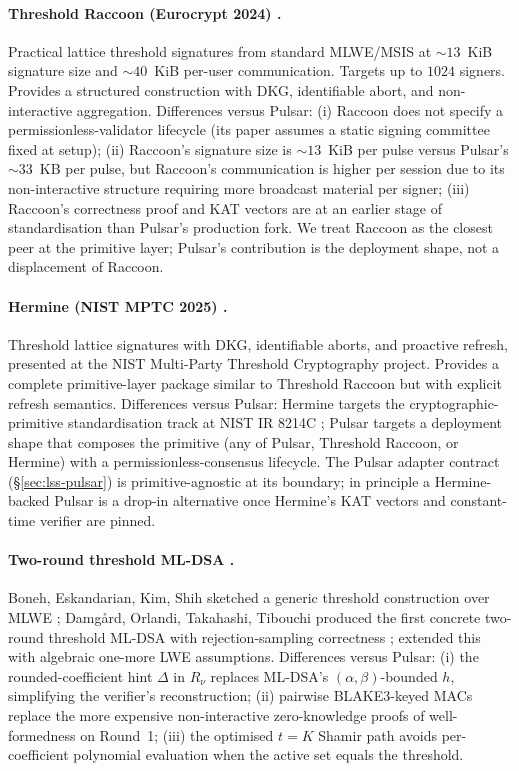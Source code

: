 \paragraph{Threshold Raccoon (Eurocrypt 2024) \cite{thresholdraccoon}.}
Practical lattice threshold signatures from standard MLWE/MSIS at
$\sim 13$~KiB signature size and $\sim 40$~KiB per-user communication.
Targets up to $1024$ signers. Provides a structured construction with
DKG, identifiable abort, and non-interactive aggregation. Differences
versus Pulsar: (i) Raccoon does not specify a permissionless-validator
lifecycle (its paper assumes a static signing committee fixed at
setup); (ii) Raccoon's signature size is $\sim 13$~KiB per pulse versus
Pulsar's $\sim 33$~KB per pulse, but Raccoon's communication is higher
per session due to its non-interactive structure requiring more
broadcast material per signer; (iii) Raccoon's correctness proof and
KAT vectors are at an earlier stage of standardisation than Pulsar's
production fork. We treat Raccoon as the closest peer at the
primitive layer; Pulsar's contribution is the deployment shape, not a
displacement of Raccoon.

\paragraph{Hermine (NIST MPTC 2025) \cite{hermine}.} Threshold lattice
signatures with DKG, identifiable aborts, and proactive refresh,
presented at the NIST Multi-Party Threshold Cryptography project.
Provides a complete primitive-layer package similar to Threshold
Raccoon but with explicit refresh semantics. Differences versus
Pulsar: Hermine targets the cryptographic-primitive standardisation
track at NIST IR 8214C \cite{nistir8214c}; Pulsar targets a
deployment shape that composes the primitive (any of Pulsar,
Threshold Raccoon, or Hermine) with a permissionless-consensus
lifecycle. The Pulsar adapter contract
(\S\ref{sec:lss-pulsar}) is primitive-agnostic at its boundary; in
principle a Hermine-backed Pulsar is a drop-in alternative once
Hermine's KAT vectors and constant-time verifier are pinned.

\paragraph{Two-round threshold ML-DSA {\cite{boneh2018,damgard2021,
dttf2024}}.} Boneh, Eskandarian, Kim, Shih sketched a generic threshold
construction over MLWE \cite{boneh2018}; Damg\aa{}rd, Orlandi,
Takahashi, Tibouchi produced the first concrete two-round threshold
ML-DSA with rejection-sampling correctness \cite{damgard2021};
\cite{dttf2024} extended this with algebraic one-more LWE assumptions.
Differences versus Pulsar: (i) the rounded-coefficient hint $\Delta$
in $R_\nu$ replaces ML-DSA's $(\alpha, \beta)$-bounded $h$,
simplifying the verifier's reconstruction; (ii) pairwise BLAKE3-keyed
MACs replace the more expensive non-interactive zero-knowledge proofs
of well-formedness on Round~1; (iii) the optimised $t = K$ Shamir path
\cite{lp077} avoids per-coefficient polynomial evaluation when the
active set equals the threshold.

